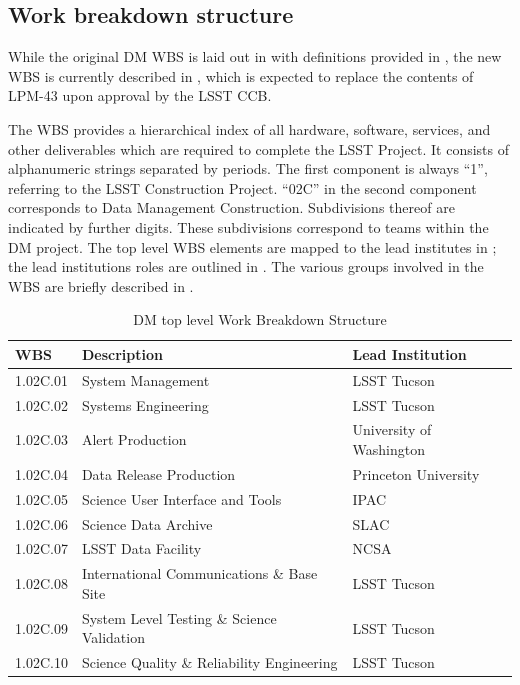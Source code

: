 \subsection{Work breakdown structure}\label{sect:WBS}

While the original DM WBS is laid out in  with definitions provided in ,
the new WBS is currently described in , which is expected to replace the contents of LPM-43 upon approval by the LSST CCB.

The WBS provides a hierarchical index of all hardware, software, services, and other deliverables which are required to complete the LSST Project.
It consists of alphanumeric strings separated by periods.
The first component is always “1”, referring to the LSST Construction Project.
``02C'' in the second component corresponds to Data Management Construction.
Subdivisions thereof are indicated by further digits.
These subdivisions correspond to teams within the DM project.
The top level WBS elements are mapped to the lead institutes in ; the lead institutions roles are outlined in .
The various groups involved in the WBS are briefly described in .

\begin{table}
\caption{DM top level Work Breakdown Structure \label{tab:wbs}}
\begin{center}
\begin{tabular}[htb]{|l|l|l|} \hline
\textbf{WBS}  &  \textbf{Description}   &  \textbf{Lead Institution}\\ \hline
1.02C.01& System Management                         &  LSST Tucson \\ \hline
1.02C.02& Systems Engineering                       &  LSST Tucson \\ \hline
1.02C.03& Alert Production                          &  University of Washington\\ \hline
1.02C.04& Data Release Production                   &  Princeton University\\ \hline
1.02C.05& Science User Interface and Tools          & IPAC\\ \hline
1.02C.06& Science Data Archive                      & SLAC\\ \hline
1.02C.07& LSST Data Facility                        & NCSA\\ \hline
1.02C.08& International Communications \& Base Site & LSST Tucson \\ \hline
1.02C.09& System Level Testing \& Science Validation& LSST Tucson \\ \hline
1.02C.10& Science Quality \& Reliability Engineering& LSST Tucson \\ \hline
\end{tabular}
\end{center}
\end{table}


